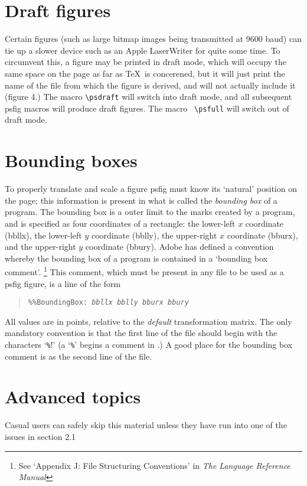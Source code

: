 \section{Draft figures}
Certain \Ps figures (such as large bitmap images being transmitted at
9600 baud) can tie up a slower \Ps device such as an
Apple LaserWriter for quite some time.
To circumvent this, a figure
may be printed in draft mode, which will occupy the same space on the
page as far as
\TeX\ is concerened, but it will just print the name of the file from 
which the figure is derived, and will not actually include it (figure 4.)
The macro {\tt \verb+\+psdraft} will switch into draft mode, and all
subsequent psfig macros will produce draft figures. The macro {\tt
\verb+\+psfull} will switch out of draft mode. 
\section{Bounding boxes}
To properly translate and scale a figure psfig must know its `natural'
position on the page; this information is present
in what is called the {\it bounding box} of a \Ps program. The 
bounding box is a outer limit to the marks created by a program,
and is specified as four coordinates of a rectangle: the lower-left $x$ coordinate
(bbllx), the lower-left $y$ coordinate (bblly), the upper-right
$x$ coordinate (bburx), and the upper-right $y$ coordinate (bbury).
Adobe has defined a convention whereby the bounding box of a program
is contained in a `bounding box comment'.
\footnote[1]{See `Appendix J: \Ps File Structuring Conventions' in
{\it The \Ps Language Reference Manual}}
This comment, which must be present in any file to be used as a psfig figure,
is a line of the form
\begin{quote}\small
\tt \verb+%%+BoundingBox: \it bbllx bblly bburx bbury
\end{quote}
All values are in \Ps points, relative to the {\it default}
transformation matrix. The only mandatory \Ps convention is
that the first line of the file should begin with the characters
`\verb+%+!' (a `\verb+%+' begins a comment in \Ps.) A good place for the
bounding box comment is as the second line of the file.
\par
\section{Advanced topics}
Casual users can safely skip this material unless they have run into 
one of the issues in section 2.1
